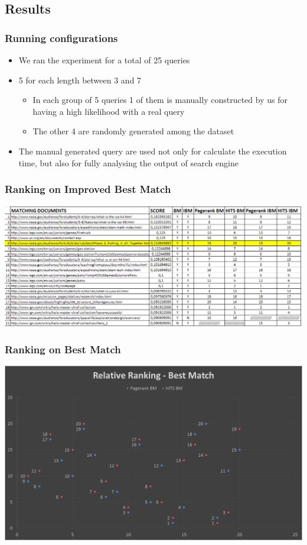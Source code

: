 \documentclass{beamer}
\begin{document}
\subsection{Results}
\begin{frame}
\frametitle{Running configurations}
\begin{itemize}
\item We ran the experiment for a total of 25 queries
\item 5 for each length between 3 and 7
\begin{itemize}
\item In each group of 5 queries 1 of them is manually constructed by us for having a high likelihood with a real query
\item The other 4 are randomly generated among the dataset
\end{itemize} 
\item The manual generated  query are used not only for calculate the execution time, but also for fully analysing the output of search engine
\end{itemize}
\end{frame}

\begin{frame}
\frametitle{Ranking on Improved Best Match}
\begin{center}\includegraphics[scale=0.40]{img/Search/Query.PNG} \end{center}
\end{frame}

\begin{frame}
\frametitle{Ranking on Best Match}
\begin{center}
\includegraphics[scale=0.20]{img/Search/Best.PNG} 
\end{center}
\end{frame}
\end{document}

